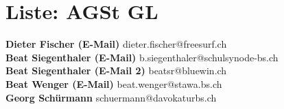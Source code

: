 \documentclass{scrartcl}
\begin{document}
\section*{Liste: AGSt GL}
\textbf{Dieter Fischer (E-Mail) } dieter.fischer@freesurf.ch\\
\textbf{Beat Siegenthaler (E-Mail) } b.siegenthaler@schulsynode-bs.ch\\
\textbf{Beat Siegenthaler (E-Mail 2) } beatsr@bluewin.ch\\
\textbf{Beat Wenger (E-Mail) } beat.wenger@stawa.bs.ch\\
\textbf{Georg Schürmann } schuermann@davokaturbs.ch\\
\end{document}
